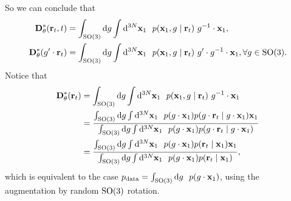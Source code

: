 So we can conclude that
\begin{align}
    \mathbf{D}_{\theta}^*(\mathbf{r}_t,t)&=\int_{\mathrm{SO}(3)} \mathrm{d} g \int\mathrm{d}^{3N}\mathbf{x}_1 ~~p(\mathbf{x}_1,g\mid \mathbf{r}_t)~ g^{-1}\cdot \mathbf{x}_1, \\
    \mathbf{D}_{\theta}^*(g'\cdot \mathbf{r}_t)&=\int_{\mathrm{SO}(3)} \mathrm{d} g\int\mathrm{d}^{3N}\mathbf{x}_1 ~~p(\mathbf{x}_1,g\mid \mathbf{r}_t)~ g'\cdot g^{-1}\cdot \mathbf{x}_1, \forall g \in \mathrm{SO}(3).
\end{align}
Notice that
\begin{align}
    \mathbf{D}_{\theta}^*(\mathbf{r}_t)&=\int_{\mathrm{SO}(3)} \mathrm{d} g \int\mathrm{d}^{3N}\mathbf{x}_1 ~~p(\mathbf{x}_1,g\mid \mathbf{r}_t)~ g^{-1}\cdot \mathbf{x}_1\\
    &=\frac{\int_{\mathrm{SO}(3)} \mathrm{d} g \int\mathrm{d}^{3N}\mathbf{x}_1 ~~p(g\cdot\mathbf{x}_1)p(g\cdot \mathbf{r}_t\mid g\cdot\mathbf{x}_1)\mathbf{x}_1}{\int_{\mathrm{SO}(3)} \mathrm{d} g \int\mathrm{d}^{3N}\mathbf{x}_1 ~~p(g\cdot\mathbf{x}_1)p(g\cdot \mathbf{r}_t\mid g\cdot\mathbf{x}_1)}\\
    &=\frac{\int_{\mathrm{SO}(3)} \mathrm{d} g \int\mathrm{d}^{3N}\mathbf{x}_1 ~~p(g\cdot\mathbf{x}_1)p(\mathbf{r}_t\mid \mathbf{x}_1)\mathbf{x}_1}{\int_{\mathrm{SO}(3)} \mathrm{d} g \int\mathrm{d}^{3N}\mathbf{x}_1 ~~p(g\cdot\mathbf{x}_1)p(\mathbf{r}_t\mid \mathbf{x}_1)},
\end{align}
which is equivalent to the case $p_{\text{data}}=\int_{\mathrm{SO}(3)}\mathrm{d} g ~~p(g\cdot\mathbf{x}_1)$, \ie using the augmentation by random $\mathrm{SO}(3)$ rotation.

